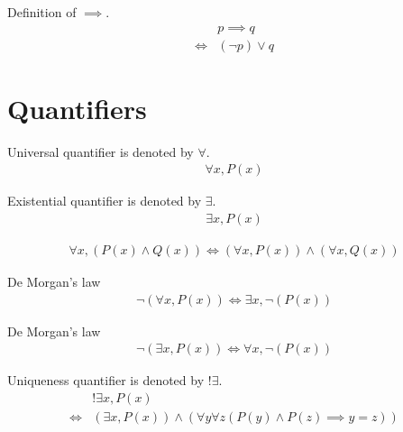 \begin{defn}
\label{Definition:implies}
Definition of $\implies$.
\begin{align*}
& p \implies q \\
\iff & (\lnot p) \lor q
\end{align*}
\end{defn}

\section{Quantifiers}
\begin{defn}
Universal quantifier is denoted by $\forall$.
\begin{align*}
\forall x, P(x)
\end{align*}
\end{defn}

\begin{defn}
Existential quantifier is denoted by $\exists$.
\begin{align*}
\exists x, P(x)
\end{align*}
\end{defn}

\begin{axm}
\label{axiom:forall_land_distributive}
\begin{align*}
\forall x, (P(x) \land Q(x)) \iff (\forall x, P(x)) \land (\forall x, Q(x))
\end{align*}
\end{axm}

\begin{axm}
\label{axiom:De_Morgan_1}
De Morgan's law
\begin{align*}
\lnot (\forall x, P(x)) \iff \exists x, \lnot (P(x))
\end{align*}
\end{axm}

\begin{axm}
\label{axiom:De_Morgan_2}
De Morgan's law
\begin{align*}
\lnot (\exists x, P(x)) \iff \forall x, \lnot (P(x))
\end{align*}
\end{axm}

\begin{defn}
Uniqueness quantifier is denoted by $!\exists$.
\begin{align*}
& !\exists x, P(x) \\
\iff & (\exists x, P(x)) \land (\forall y \forall z (P(y) \land P(z) \implies y = z))
\end{align*}
\end{defn}


